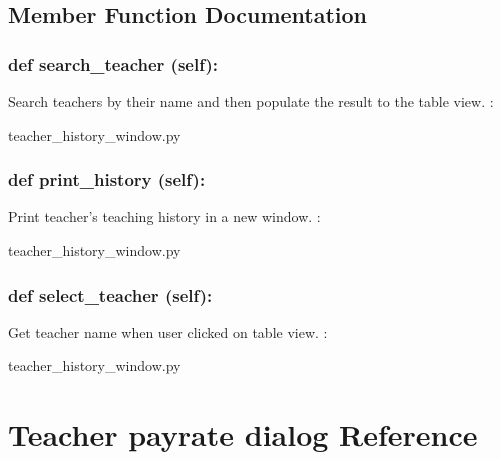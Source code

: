 \subsection{Member Function Documentation}
\hypertarget{class_poly_a14a7ad77ce612b0c54f531d307ee4b39}{
\subsubsection[{def search_teacher (self):}]{\setlength{\rightskip}{0pt plus 5cm}def {search\_teacher} (self):}}\label{class_poly_a14a7ad77ce612b0c54f531d307ee4b39}
Search teachers by their name and then populate the result to the table view.
:\begin{DoxyCompactItemize}
\item 
teacher\_history\_window.\-py\end{DoxyCompactItemize}

\hypertarget{class_poly_a14a7ad77ce612b0c54f531d307ee4b39}{
\subsubsection[{def print_history (self):}]{\setlength{\rightskip}{0pt plus 5cm}def {print\_history} (self):}}\label{class_poly_a14a7ad77ce612b0c54f531d307ee4b39}
Print teacher's teaching history in a new window.
:\begin{DoxyCompactItemize}
\item 
teacher\_history\_window.\-py\end{DoxyCompactItemize}

\hypertarget{class_poly_a14a7ad77ce612b0c54f531d307ee4b39}{
\subsubsection[{def select_teacher (self):}]{\setlength{\rightskip}{0pt plus 5cm}def {select\_teacher} (self):}}\label{class_poly_a14a7ad77ce612b0c54f531d307ee4b39}
Get teacher name when user clicked on table view. 
:\begin{DoxyCompactItemize}
\item 
teacher\_history\_window.\-py\end{DoxyCompactItemize}


\hypertarget{Teacher_payrate_dialog}{\section{Teacher payrate dialog Reference}
\label{Teacher_payrate_dialog}
}
